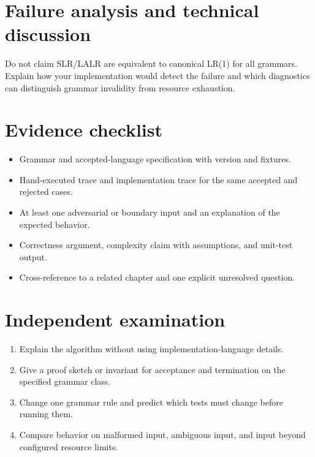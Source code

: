 \documentclass[11pt,letterpaper]{article}
\begin{document}
\section{Failure analysis and technical discussion}
Do not claim SLR/LALR are equivalent to canonical LR(1) for all grammars. Explain how your implementation would detect the failure and which diagnostics can distinguish grammar invalidity from resource exhaustion.
\section{Evidence checklist}
\begin{itemize}
\item Grammar and accepted-language specification with version and fixtures.
\item Hand-executed trace and implementation trace for the same accepted and rejected cases.
\item At least one adversarial or boundary input and an explanation of the expected behavior.
\item Correctness argument, complexity claim with assumptions, and unit-test output.
\item Cross-reference to a related chapter and one explicit unresolved question.
\end{itemize}
\section{Independent examination}
\begin{enumerate}
\item Explain the algorithm without using implementation-language details.
\item Give a proof sketch or invariant for acceptance and termination on the specified grammar class.
\item Change one grammar rule and predict which tests must change before running them.
\item Compare behavior on malformed input, ambiguous input, and input beyond configured resource limits.
\end{enumerate}
\end{document}
